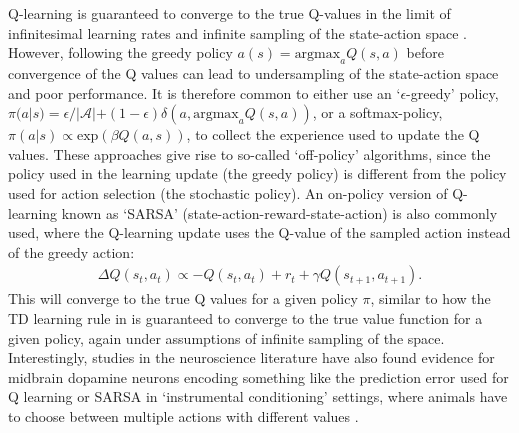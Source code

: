 Q-learning is guaranteed to converge to the true Q-values in the limit of infinitesimal learning rates and infinite sampling of the state-action space \citep{watkins1992q,sutton2018reinforcement}.
However, following the greedy policy $a(s) = \text{argmax}_{a} Q(s, a)$ before convergence of the Q values can lead to undersampling of the state-action space and poor performance.
It is therefore common to either use an `$\epsilon$-greedy' policy, $\pi(a|s) = \epsilon / |\mathcal{A}| + (1-\epsilon) \delta(a, \text{argmax}_{a} Q(s, a))$, or a softmax-policy, $\pi(a|s) \propto \text{exp}(\beta Q(a, s))$, to collect the experience used to update the Q values.
These approaches give rise to so-called `off-policy' algorithms, since the policy used in the learning update (the greedy policy) is different from the policy used for action selection (the stochastic policy).
An on-policy version of Q-learning known as `SARSA' (state-action-reward-state-action) is also commonly used, where the Q-learning update uses the Q-value of the sampled action instead of the greedy action:
\begin{align}
    \Delta  Q(s_t,a_t) \propto - Q(s_t,a_t) + r_t + \gamma Q(s_{t+1}, a_{t+1}).
\end{align}
This will converge to the true Q values for a given policy $\pi$, similar to how the TD learning rule in  is guaranteed to converge to the true value function for a given policy, again under assumptions of infinite sampling of the space.
Interestingly, studies in the neuroscience literature have also found evidence for midbrain dopamine neurons encoding something like the prediction error used for Q learning \citep{roesch2007dopamine} or SARSA \citep{morris2006midbrain} in `instrumental conditioning' settings, where animals have to choose between multiple actions with different values \citep{niv2009reinforcement}.

